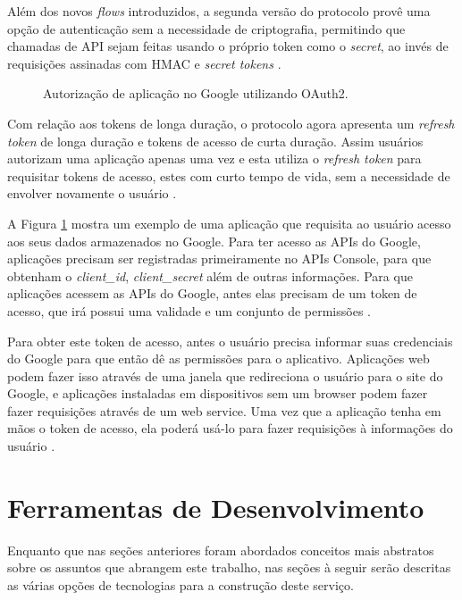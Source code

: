 \documentclass[diss]{template/setrem}
\begin{document}
Além dos novos \emph{flows} introduzidos, a segunda versão do protocolo provê uma opção de autenticação sem a necessidade de criptografia, permitindo que chamadas de API sejam feitas usando o próprio token como o \emph{secret}, ao invés de requisições assinadas com HMAC e \emph{secret tokens} \citep{Hammer2010}.

\begin{figure}[!h]
    \caption{Autorização de aplicação no Google utilizando OAuth2.}
    \label{fig:google-oauth}
\end{figure}

Com relação aos tokens de longa duração, o protocolo agora apresenta um \emph{refresh token} de longa duração e tokens de acesso de curta duração. Assim usuários autorizam uma aplicação apenas uma vez e esta utiliza o \emph{refresh token} para requisitar tokens de acesso, estes com curto tempo de vida, sem a necessidade de envolver novamente o usuário \citep{Hammer2010}.

A Figura \ref{fig:google-oauth} mostra um exemplo de uma aplicação que requisita ao usuário acesso aos seus dados armazenados no Google. Para ter acesso as APIs do Google, aplicações precisam ser registradas primeiramente no APIs Console, para que obtenham o \emph{client\_id}, \emph{client\_secret} além de outras informações. Para que aplicações acessem as APIs do Google, antes elas precisam de um token de acesso, que irá possui uma validade e um conjunto de permissões \citep{Google2012}.

Para obter este token de acesso, antes o usuário precisa informar suas credenciais do Google para que então dê as permissões para o aplicativo. Aplicações web podem fazer isso através de uma janela que redireciona o usuário para o site do Google, e aplicações instaladas em dispositivos sem um browser podem fazer fazer requisições através de um web service. Uma vez que a aplicação tenha em mãos o token de acesso, ela poderá usá-lo para fazer requisições à informações do usuário \citep{Google2012}.

\section{Ferramentas de Desenvolvimento}
Enquanto que nas seções anteriores foram abordados conceitos mais abstratos sobre os assuntos que abrangem este trabalho, nas seções à seguir serão descritas as várias opções de tecnologias para a construção deste serviço.
\end{document}
